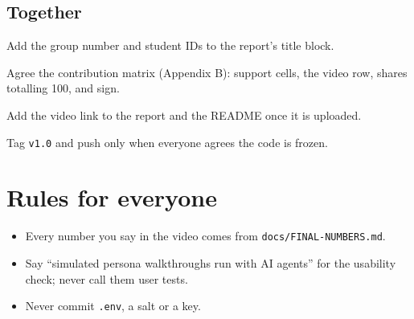 \subsection*{Together}
\begin{checklist}
\item Add the group number and student IDs to the report's title block.
\item Agree the contribution matrix (Appendix B): support cells, the video row, shares totalling 100, and sign.
\item Add the video link to the report and the README once it is uploaded.
\item Tag \texttt{v1.0} and push only when everyone agrees the code is frozen.
\end{checklist}

\section*{Rules for everyone}
\begin{itemize}
\item Every number you say in the video comes from \nolinkurl{docs/FINAL-NUMBERS.md}.
\item Say ``simulated persona walkthroughs run with AI agents'' for the usability check; never call them user tests.
\item Never commit \texttt{.env}, a salt or a key.
\end{itemize}
